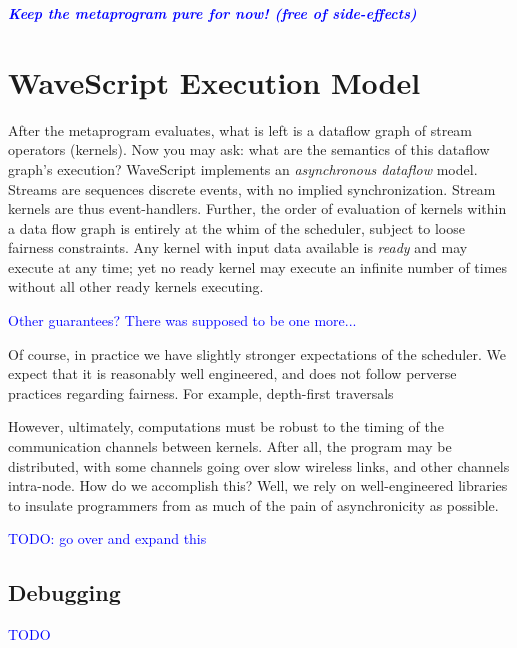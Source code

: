 \documentclass[twocolumn]{report}
\newcommand{\rednote}[1]{{\textcolor{blue}{#1}}}
\begin{document}
\rednote{\em \bf Keep the metaprogram pure for now! (free of side-effects)}

\chapter{WaveScript Execution Model}

After the metaprogram evaluates, what is left is a dataflow graph of
stream operators (kernels).  Now you may ask: what are the semantics
of this dataflow graph's execution?  WaveScript implements an {\em
asynchronous dataflow} model.  Streams are sequences discrete events,
with no implied synchronization.  Stream kernels are thus
event-handlers.  Further, the order of evaluation of kernels within a
data flow graph is entirely at the whim of the scheduler, subject to
loose fairness constraints.  Any kernel with input data available is
{\em ready} and may execute at any time; yet no ready kernel may
execute an infinite number of times without all other ready kernels
executing.

\rednote{Other guarantees?  There was supposed to be one more...}

Of course, in practice we have slightly stronger expectations of the
scheduler.  We expect that it is reasonably well engineered, and does not
follow perverse practices regarding fairness.  For example,
depth-first traversals

However, ultimately, computations must be robust to the timing of the
communication channels between kernels.  After all, the program may be
distributed, with some channels going over slow wireless links, and
other channels intra-node.  How do we accomplish this?  Well, we rely
on well-engineered libraries to insulate programmers from as much of
the pain of asynchronicity as possible.

\rednote{TODO: go over and expand this}

\section{Debugging}

\rednote{TODO}


\end{document}
